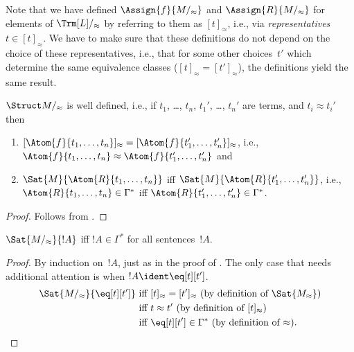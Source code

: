 \documentclass[../../include/open-logic-section]{subfiles}
\begin{document}
\begin{explain}
Note that we have defined $\Assign{f}{M/_\approx}$ and
$\Assign{R}{M/_\approx}$ for elements of $\Trm[L]/_\approx$ by referring
to them as $[t]_\approx$, i.e., via \emph{representatives}~$t \in
[t]_\approx$.  We have to make sure that these definitions do not
depend on the choice of these representatives, i.e., that for some
other choices~$t'$ which determine the same equivalence classes
($[t]_\approx = [t']_\approx$), the definitions yield the same result.
\end{explain}

\begin{prop}
$\Struct M/_\approx$ is well defined, i.e., if $t_1$, \dots, $t_n$,
  $t_1'$, \dots, $t_n'$ are terms, and $t_i \approx t_i'$ then
\begin{enumerate}
\item $[\Atom{f}{t_1,\dots, t_n}]_\approx = [\Atom{f}{t_1',\dots,
    t_n'}]_\approx$, i.e., $\Atom{f}{t_1,\dots, t_n} \approx
  \Atom{f}{t_1',\dots, t_n'}$ and
\item $\Sat{M}{\Atom{R}{t_1,\dots, t_n}}$ iff
  $\Sat{M}{\Atom{R}{t_1',\dots, t_n'}}$, i.e., $\Atom{R}{t_1,\dots,
  t_n} \in \Gamma^*$ iff $\Atom{R}{t_1',\dots, t_n'} \in \Gamma^*$.
\end{enumerate}
\end{prop}

\begin{proof}
Follows from .
\end{proof}

\begin{lem}
$\Sat{M/_\approx}{!A}$ iff $!A \in \Gamma^*$ for all
  sentences~$!A$.
\end{lem}

\begin{proof}
By induction on~$!A$, just as in the proof of .
The only case that needs additional attention is when $!A \ident
\eq[t][t']$.
\begin{align*}
\Sat{M/_\approx}{\eq[t][t']} & \text{ iff } [t]_\approx = [t']_\approx
\text{ (by definition of $\Sat{M_\approx}$)}\\ 
& \text{ iff } t \approx t' \text{ (by definition of $[t]_\approx$)}\\ 
& \text{ iff } \eq[t][t'] \in \Gamma^* \text{ (by definition of $\approx$).}
\end{align*}
\end{proof}
\end{document}
